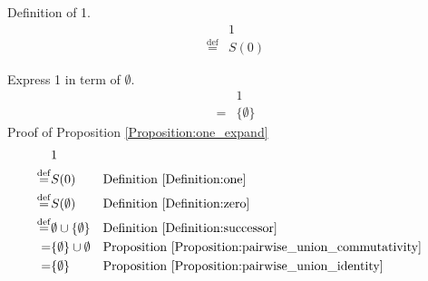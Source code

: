 \begin{defn}
\label{Definition:one}
Definition of 1.
\begin{align*}
& 1 \\
\overset{\operatorname{def}}{=} & S(0)
\end{align*}
\end{defn}

\begin{prop}
\label{Proposition:one_expand}
Express 1 in term of $\emptyset$.
\begin{align*}
& 1 \\
= & \{ \emptyset \}
\end{align*}
Proof of Proposition \ref{Proposition:one_expand}
\begin{align*}
& 1 \\
\overset{\operatorname{def}}{=} & S(0)
& & \text{Definition \ref{Definition:one}} \\
\overset{\operatorname{def}}{=} & S(\emptyset)
& & \text{Definition \ref{Definition:zero}} \\
\overset{\operatorname{def}}{=} & \emptyset \cup \{ \emptyset \}
& & \text{Definition \ref{Definition:successor}} \\
= & \{ \emptyset \} \cup \emptyset
& & \text{Proposition \ref{Proposition:pairwise_union_commutativity}} \\
= & \{ \emptyset \}
& & \text{Proposition \ref{Proposition:pairwise_union_identity}} \\
\end{align*}
\end{prop}

